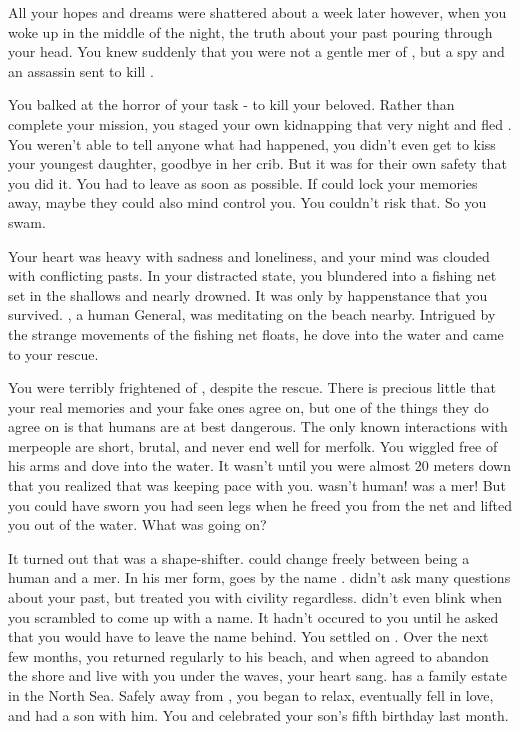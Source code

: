 \documentclass[char]{NeptuneBall}
\begin{document}
All your hopes and dreams were shattered about a week later however, when you woke up in the middle of the night, the truth about your past pouring through your head. You knew suddenly that you were not a gentle mer\cQueen{\human} of \pAtlantis{}, but a spy and an assassin sent to kill \cKing{\King} \cKing{}.

You balked at the horror of your task - to kill your beloved. Rather than complete your mission, you staged your own kidnapping that very night and fled \pAtlantis{}. You weren't able to tell anyone what had happened, you didn't even get to kiss your youngest daughter, \cPrincess{} goodbye in her crib. But it was for their own safety that you did it. You had to leave as soon as possible. If \pAssassin{} could lock your memories away, maybe they could also mind control you. You couldn't risk that. So you swam.

Your heart was heavy with sadness and loneliness, and your mind was clouded with conflicting pasts. In your distracted state, you blundered into a fishing net set in the shallows and nearly drowned. It was only by happenstance that you survived. \cGeneral{}, a human General, was meditating on the beach nearby. Intrigued by the strange movements of the fishing net floats, he dove into the water and came to your rescue. 

You were terribly frightened of \cGeneral{\them}, despite the rescue. There is precious little that your real memories and your fake ones agree on, but one of the things they do agree on is that humans are at best dangerous. The only known interactions with merpeople are short, brutal, and never end well for merfolk. You wiggled free of his arms and dove into the water. It wasn't until you were almost 20 meters down that you realized that \cGeneral{} was keeping pace with you. \cGeneral{\They} wasn't human! \cGeneral{\They} was a mer\cGeneral{\human}! But you could have sworn you had seen legs when he freed you from the net and lifted you out of the water. What was going on? 

It turned out that \cGeneral{} was a shape-shifter. \cGeneral{\They} could change freely between being a human and a mer\cGeneral{\human}. In his mer\cGeneral{\human} form, \cGeneral{} goes by the name \cGeneral{\MYname}. \cGeneral{} didn't ask many questions about your past, but treated you with civility regardless. \cGeneral{\they} didn't even blink when you scrambled to come up with a name. It hadn't occured to you until he asked that you would have to leave the name \cQueen{} behind. You settled on \cQueen{\MYname}. Over the next few months, you returned regularly to his beach, and when \cGeneral{\they} agreed to abandon the shore and live with you under the waves, your heart sang.  \cGeneral{} has a family estate in the North Sea. Safely away from \pAtlantis{}, you began to relax, eventually fell in love, and had a son with him. You and \cGeneral{} celebrated your son's fifth birthday last month. 
\end{document}
